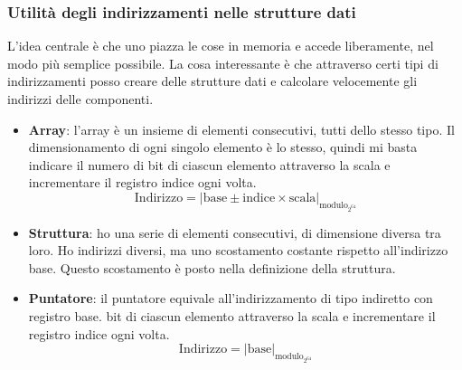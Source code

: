 \subsubsection{Utilità degli indirizzamenti nelle strutture dati} L'idea centrale è che uno piazza le cose in memoria e accede liberamente, nel modo più semplice possibile. La cosa interessante è che attraverso certi tipi di indirizzamenti posso creare delle strutture dati e calcolare velocemente gli indirizzi delle componenti.
\begin{itemize}
	\item \textbf{Array}: l'array è un insieme di elementi consecutivi, tutti dello stesso tipo. Il dimensionamento di ogni singolo elemento è lo stesso, quindi mi basta indicare il numero di bit di ciascun elemento attraverso la scala e incrementare il registro indice ogni volta.
	\[\text{Indirizzo}=\left|\text{base} \pm \text{indice} \times \text{scala}\right|_{\text{modulo}_{2^{64}}}\]
	\item \textbf{Struttura}: ho una serie di elementi consecutivi, di dimensione diversa tra loro. Ho indirizzi diversi, ma uno scostamento costante rispetto all'indirizzo base. Questo scostamento è posto nella definizione della struttura.
	\item \textbf{Puntatore}: il puntatore equivale all'indirizzamento di tipo indiretto con registro base. bit di ciascun elemento attraverso la scala e incrementare il registro indice ogni volta.
	\[\text{Indirizzo}=\left|\text{base}\right|_{\text{modulo}_{2^{64}}}\]
\end{itemize}
\clearpage 
